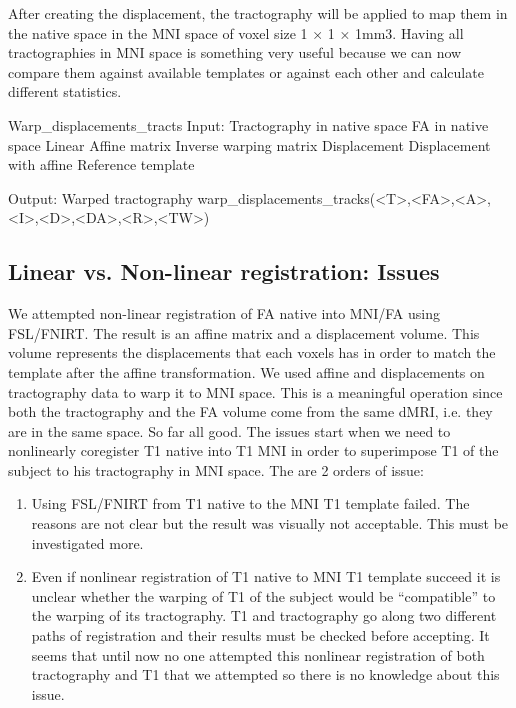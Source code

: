 After creating the displacement, the tractography will be applied to map them in the native space in the MNI space of voxel size 1 × 1 × 1mm3. Having all tractographies in MNI space is something very useful because we can now compare them against available templates or against each other and calculate different statistics. 

\begin{python}
Warp_displacements_tracts
Input:  Tractography in native space
	FA in native space
        Linear Affine matrix
        Inverse warping matrix
        Displacement
        Displacement with affine
        Reference template
                
Output: Warped tractography
warp_displacements_tracks(<T>,<FA>,<A>,<I>,<D>,<DA>,<R>,<TW>)
\end{python} 

\subsection{Linear vs. Non-linear registration: Issues}

We attempted non-linear registration of FA native into MNI/FA using FSL/FNIRT. The result is an affine matrix and a displacement
volume. This volume represents the displacements that each voxels has in order to match the template after the affine transformation. We
used affine and displacements on tractography data to warp it to MNI space. This is a meaningful operation since both the tractography and
the FA volume come from the same dMRI, i.e. they are in the same space. So far all good. The issues start when we need to nonlinearly
coregister T1 native into T1 MNI in order to superimpose T1 of the subject to his tractography in MNI space. The are 2 orders of issue:
\begin{enumerate}
\item Using FSL/FNIRT from T1 native to the MNI T1 template failed. The reasons are not clear but the result was visually not acceptable. This must be investigated more.
\item Even if nonlinear registration of T1 native to MNI T1 template succeed it is unclear whether the warping of T1 of the subject would be ``compatible'' to the warping of its tractography. T1 and tractography go along two different paths of registration and their results must be checked before accepting. It seems that until now no one attempted this nonlinear registration of both tractography and T1 that we attempted so there is no knowledge about this issue.
\end{enumerate}

